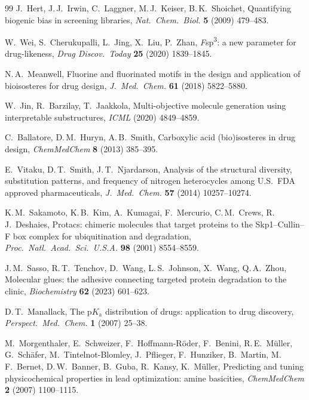\documentclass[10pt,a4paper,twocolumn]{article}
\begin{document}
\begin{thebibliography}{99}
J.~Hert, J.\,J.~Irwin, C.~Laggner, M.\,J.~Keiser, B.\,K.~Shoichet,
Quantifying biogenic bias in screening libraries,
\textit{Nat.\ Chem.\ Biol.} \textbf{5} (2009) 479--483.

W.~Wei, S.~Cherukupalli, L.~Jing, X.~Liu, P.~Zhan,
\textit{F}sp\textsuperscript{3}: a new parameter for drug-likeness,
\textit{Drug Discov.\ Today} \textbf{25} (2020) 1839--1845.

N.\,A.~Meanwell,
Fluorine and fluorinated motifs in the design and application of bioisosteres for drug design,
\textit{J.\ Med.\ Chem.} \textbf{61} (2018) 5822--5880.

W.~Jin, R.~Barzilay, T.~Jaakkola,
Multi-objective molecule generation using interpretable substructures,
\textit{ICML} (2020) 4849--4859.

C.~Ballatore, D.\,M.~Huryn, A.\,B.~Smith,
Carboxylic acid (bio)isosteres in drug design,
\textit{ChemMedChem} \textbf{8} (2013) 385--395.

E.~Vitaku, D.\,T.~Smith, J.\,T.~Njardarson,
Analysis of the structural diversity, substitution patterns, and frequency of nitrogen heterocycles among U.S.\ FDA approved pharmaceuticals,
\textit{J.\ Med.\ Chem.} \textbf{57} (2014) 10257--10274.

K.\,M.~Sakamoto, K.\,B.~Kim, A.~Kumagai, F.~Mercurio, C.\,M.~Crews, R.\,J.~Deshaies,
Protacs: chimeric molecules that target proteins to the Skp1--Cullin--F box complex for ubiquitination and degradation,
\textit{Proc.\ Natl.\ Acad.\ Sci.\ U.S.A.} \textbf{98} (2001) 8554--8559.

J.\,M.~Sasso, R.\,T.~Tenchov, D.~Wang, L.\,S.~Johnson, X.~Wang, Q.\,A.~Zhou,
Molecular glues: the adhesive connecting targeted protein degradation to the clinic,
\textit{Biochemistry} \textbf{62} (2023) 601--623.

D.\,T.~Manallack,
The p$K_\mathrm{a}$ distribution of drugs: application to drug discovery,
\textit{Perspect.\ Med.\ Chem.} \textbf{1} (2007) 25--38.

M.~Morgenthaler, E.~Schweizer, F.~Hoffmann-R{\"o}der, F.~Benini, R.\,E.~M{\"u}ller, G.~Sch{\"a}fer, M.~Tintelnot-Blomley, J.~Pflieger, F.~Hunziker, B.~Martin, M.\,F.~Bernet, D.\,W.~Banner, B.~Guba, R.~Kansy, K.~M{\"u}ller,
Predicting and tuning physicochemical properties in lead optimization: amine basicities,
\textit{ChemMedChem} \textbf{2} (2007) 1100--1115.


\end{thebibliography}
\end{document}
